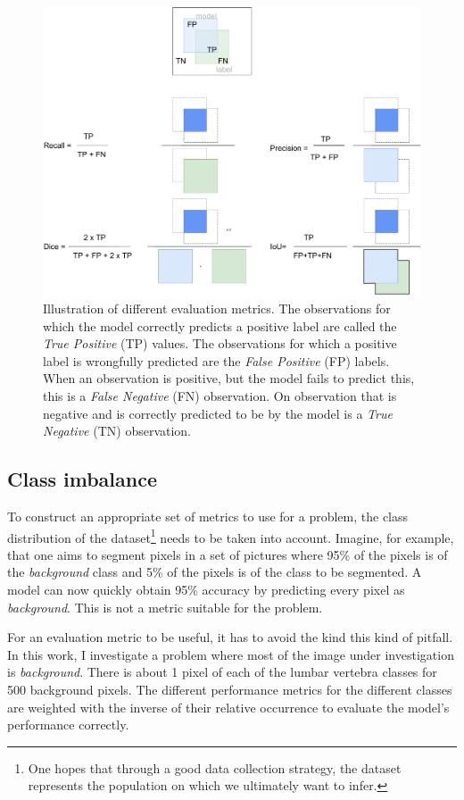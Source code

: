 \begin{figure}
    \centering
    \includegraphics[width=.95\textwidth]{images/Metrics.pdf}
    \caption{Illustration of different evaluation metrics. 
    The observations for which the model correctly predicts a positive label are called the \textit{True Positive} (TP) values.
    The observations for which a positive label is wrongfully predicted are the \textit{False Positive} (FP) labels. 
    When an observation is positive, but the model fails to predict this, this is a \textit{False Negative} (FN) observation.
    On observation that is negative and is correctly predicted to be by the model is a \textit{True Negative} (TN) observation.
    }
\end{figure}

\subsection{Class imbalance\label{sec:class_imbalance}}
\par{
    To construct an appropriate set of metrics to use for a problem, the class distribution of the dataset\footnote{
        One hopes that through a good data collection strategy, the dataset represents the population on which we ultimately want to infer.
        } needs to be taken into account.
    Imagine, for example, that one aims to segment pixels in a set of pictures where 95\% of the pixels is of the \textit{background} class and 5\% of the pixels is of the class to be segmented.
    A model can now quickly obtain 95\% accuracy by predicting every pixel as \textit{background}. This is not a metric suitable for the problem.
}
\par{
    For an evaluation metric to be useful, it has to avoid the kind this kind of pitfall.
    In this work, I investigate a problem where most of the image under investigation is \textit{background}. 
    There is about 1 pixel of each of the lumbar vertebra classes for 500 background pixels.
    The different performance metrics for the different classes are weighted with the inverse of their relative occurrence to evaluate the model's performance correctly.
}
